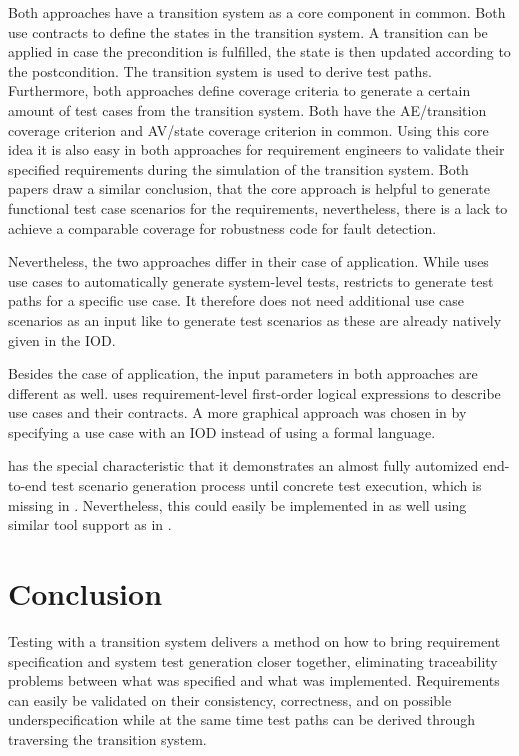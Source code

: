 Both approaches have a transition system as a core component in common. Both use contracts to define the states in the transition system. A transition can be applied in case the precondition is fulfilled, the state is then updated according to the postcondition. The transition system is used to derive test paths. Furthermore, both approaches define coverage criteria to generate a certain amount of test cases from the transition system. Both have the AE/transition coverage criterion and AV/state coverage criterion in common. Using this core idea it is also easy in both approaches for requirement engineers to validate their specified requirements during the simulation of the transition system. Both papers draw a similar conclusion, that the core approach is helpful to generate functional test case scenarios for the requirements, nevertheless, there is a lack to achieve a comparable coverage for robustness code for fault detection.

Nevertheless, the two approaches differ in their case of application. While \cite{ClementineNebut2006} uses use cases to automatically generate system-level tests, \cite{NajlaRaza2007} restricts to generate test paths for a specific use case. It therefore does not need additional use case scenarios as an input like \cite{ClementineNebut2006} to generate test scenarios as these are already natively given in the IOD. 

Besides the case of application, the input parameters in both approaches are different as well. \cite{ClementineNebut2006} uses requirement-level first-order logical expressions to describe use cases and their contracts. A more graphical approach was chosen in \cite{NajlaRaza2007} by specifying a use case with an IOD instead of using a formal language. 

\cite{ClementineNebut2006} has the special characteristic that it demonstrates an almost fully automized end-to-end test scenario generation process until concrete test execution, which is missing in \cite{NajlaRaza2007}. Nevertheless, this could easily be implemented in \cite{NajlaRaza2007} as well using similar tool support as in \cite{ClementineNebut2006}. 

\section{Conclusion} \label{conclusion}

Testing with a transition system delivers a method on how to bring requirement specification and system test generation closer together, eliminating traceability problems between what was specified and what was implemented. Requirements can easily be validated on their consistency, correctness, and on possible underspecification while at the same time test paths can be derived through traversing the transition system. 

